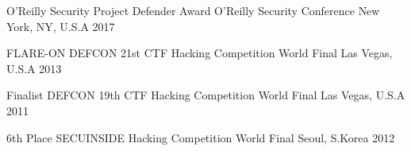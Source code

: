 




\begin{cvhonors}


\cvhonor
{O'Reilly Security Project Defender Award} %
{O'Reilly Security Conference} %
{New York, NY, U.S.A} %
{2017} %


\cvhonor
{FLARE-ON } %
{DEFCON 21st CTF Hacking Competition World Final} %
{Las Vegas, U.S.A} %
{2013} %


\cvhonor
{Finalist} %
{DEFCON 19th CTF Hacking Competition World Final} %
{Las Vegas, U.S.A} %
{2011} %


\cvhonor
{6th Place} %
{SECUINSIDE Hacking Competition World Final} %
{Seoul, S.Korea} %
{2012} %


\end{cvhonors}




